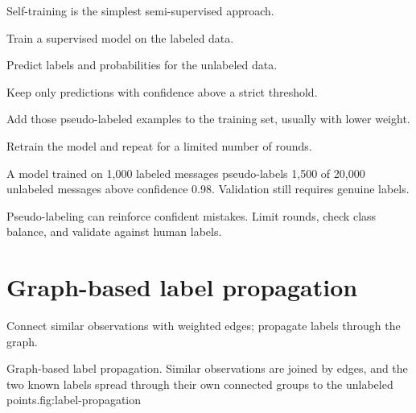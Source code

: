 Self-training is the simplest semi-supervised approach.

\begin{utpsteps}
  \item Train a supervised model on the labeled data.
  \item Predict labels and probabilities for the unlabeled data.
  \item Keep only predictions with confidence above a strict threshold.
  \item Add those pseudo-labeled examples to the training set, usually with lower weight.
  \item Retrain the model and repeat for a limited number of rounds.
\end{utpsteps}

\begin{workedexample}
A model trained on 1,000 labeled messages pseudo-labels 1,500 of 20,000 unlabeled messages above confidence 0.98. Validation still requires genuine labels.
\end{workedexample}

\begin{pitfall}
Pseudo-labeling can reinforce confident mistakes. Limit rounds, check class balance, and validate against human labels.
\end{pitfall}

\section{Graph-based label propagation}

Connect similar observations with weighted edges; propagate labels through the graph.

\begin{utpfig}{Graph-based label propagation. Similar observations are joined by edges, and the two known labels spread through their own connected groups to the unlabeled points.}{fig:label-propagation}
\end{utpfig}

